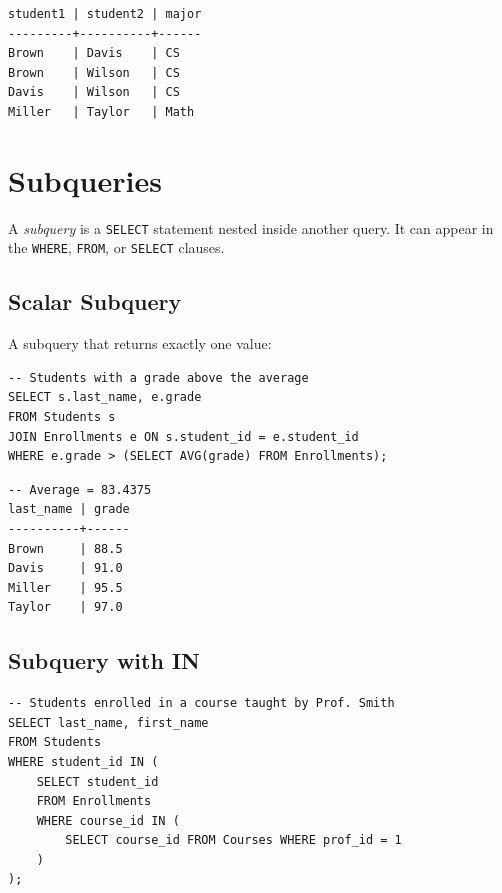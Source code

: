 \begin{codeoutput}
\begin{verbatim}
student1 | student2 | major
---------+----------+------
Brown    | Davis    | CS
Brown    | Wilson   | CS
Davis    | Wilson   | CS
Miller   | Taylor   | Math
\end{verbatim}
\end{codeoutput}

\section{Subqueries}

\begin{definition}[Subquery]
A \emph{subquery} is a \texttt{SELECT} statement nested inside another query.
It can appear in the \texttt{WHERE}, \texttt{FROM}, or \texttt{SELECT} clauses.
\end{definition}

\subsection{Scalar Subquery}

A subquery that returns exactly one value:

\begin{codeblock}[title=\textbf{Scalar Subquery}]
\begin{verbatim}
-- Students with a grade above the average
SELECT s.last_name, e.grade
FROM Students s
JOIN Enrollments e ON s.student_id = e.student_id
WHERE e.grade > (SELECT AVG(grade) FROM Enrollments);
\end{verbatim}
\end{codeblock}

\begin{codeoutput}
\begin{verbatim}
-- Average = 83.4375
last_name | grade
----------+------
Brown     | 88.5
Davis     | 91.0
Miller    | 95.5
Taylor    | 97.0
\end{verbatim}
\end{codeoutput}

\subsection{Subquery with IN}

\begin{codeblock}[title=\textbf{Subquery with IN}]
\begin{verbatim}
-- Students enrolled in a course taught by Prof. Smith
SELECT last_name, first_name
FROM Students
WHERE student_id IN (
    SELECT student_id
    FROM Enrollments
    WHERE course_id IN (
        SELECT course_id FROM Courses WHERE prof_id = 1
    )
);
\end{verbatim}
\end{codeblock}

